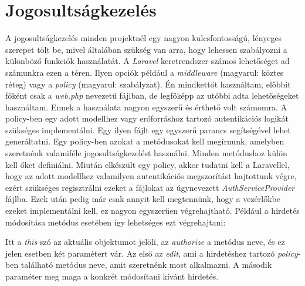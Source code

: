 \documentclass[]{thesis-ekf}
\theoremstyle{definition}
\theoremstyle{remark}
\begin{document}
	\section{Jogosultságkezelés}
		A jogosultságkezelés minden projektnél egy nagyon kulcsfontosságú, lényeges szerepet tölt be, mivel általában szükség van arra, hogy lehessen szabályozni a különböző funkciók használatát. A \emph{Laravel} keretrendszer számos lehetőséget ad számunkra ezen a téren. Ilyen opciók például a \emph{middleware} (magyarul: köztes réteg) vagy a \emph{policy} (magyarul: szabályzat). Én mindkettőt használtam, előbbit főként csak a \emph{web.php} nevezetű fájlban, de legfőképp az utóbbi adta lehetőségeket használtam. Ennek a használata nagyon egyszerű és érthető volt számomra. A policy-ben egy adott modellhez vagy erőforráshoz tartozó autentikációs logikát szükséges implementálni. Egy ilyen fájlt egy egyszerű parancs segítségével lehet generáltatni. Egy policy-ben azokat a metódusokat kell megírnunk, amelyben szeretnénk valamiféle jogosultságkezelést használni. Minden metódushoz külön kell őket definiálni. Miután elkészült egy policy, akkor tudatni kell a Laravellel, hogy az adott modellhez valamilyen autentikációs megszorítást hajtottunk végre, ezért szükséges regisztrálni ezeket a fájlokat az úgynevezett \emph{AuthServiceProvider} fájlba. Ezek után pedig már csak annyit kell megtennünk, hogy a vezérlőkbe ezeket implementálni kell, ez nagyon egyszerűen végrehajtható. Például a hirdetés módosítása metódus esetében így lehetséges ezt végrehajtani: 
		
		Itt a \emph{this} szó az aktuális objektumot jelöli, az \emph{authorize} a metódus neve, és ez jelen esetben két paramétert vár. Az első az \emph{edit}, ami a hirdetéshez tartozó \emph{policy}-ben található metódus neve, amit szeretnénk most alkalmazni. A második paraméter meg maga a konkrét módosítani kívánt hirdetés.
		\cite{Laravel}
		
\end{document}
